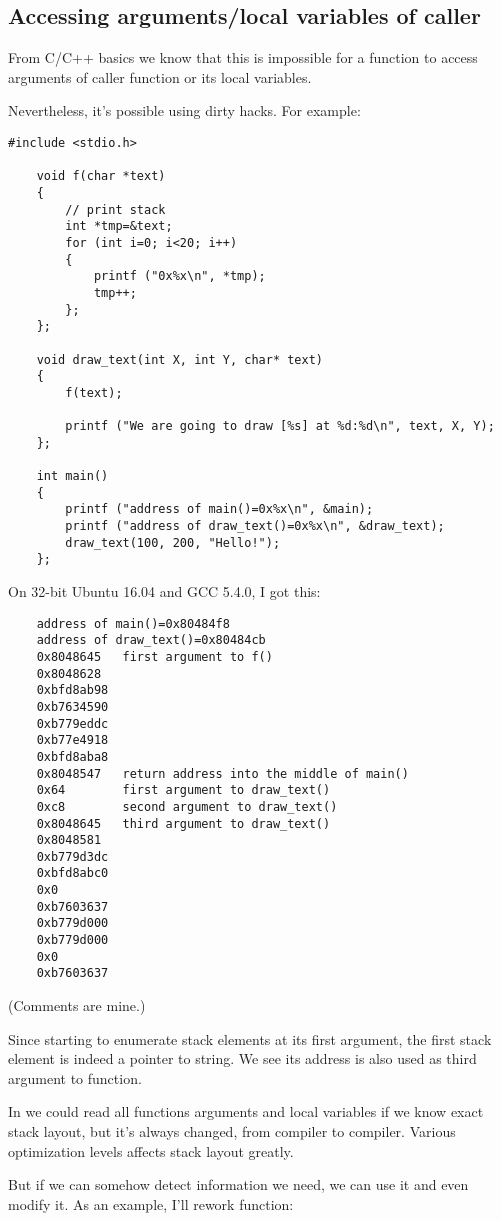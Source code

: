 \subsection{Accessing arguments/local variables of caller}

From C/C++ basics we know that this is impossible for a function to access arguments of caller function or its
local variables.

Nevertheless, it's possible using dirty hacks.
For example:

\begin{lstlisting}[style=customc]
	#include <stdio.h>

	void f(char *text)
	{
		// print stack
		int *tmp=&text;
		for (int i=0; i<20; i++)
		{
			printf ("0x%x\n", *tmp);
			tmp++;
		};
	};

	void draw_text(int X, int Y, char* text)
	{
		f(text);

		printf ("We are going to draw [%s] at %d:%d\n", text, X, Y);
	};

	int main()
	{
		printf ("address of main()=0x%x\n", &main);
		printf ("address of draw_text()=0x%x\n", &draw_text);
		draw_text(100, 200, "Hello!");
	};
\end{lstlisting}

On 32-bit Ubuntu 16.04 and GCC 5.4.0, I got this:

\begin{lstlisting}
	address of main()=0x80484f8
	address of draw_text()=0x80484cb
	0x8048645	first argument to f()
	0x8048628
	0xbfd8ab98
	0xb7634590
	0xb779eddc
	0xb77e4918
	0xbfd8aba8
	0x8048547	return address into the middle of main()
	0x64		first argument to draw_text()
	0xc8		second argument to draw_text()
	0x8048645	third argument to draw_text()
	0x8048581
	0xb779d3dc
	0xbfd8abc0
	0x0
	0xb7603637
	0xb779d000
	0xb779d000
	0x0
	0xb7603637
\end{lstlisting}

(Comments are mine.)

Since  starting to enumerate stack elements at its first argument, the first stack element is indeed a pointer
to  string. We see its address is also used as third argument to  function.

In  we could read all functions arguments and local variables if we know exact stack layout, but it's always
changed, from compiler to compiler.
Various optimization levels affects stack layout greatly.

But if we can somehow detect information we need, we can use it and even modify it.
As an example, I'll rework  function:

